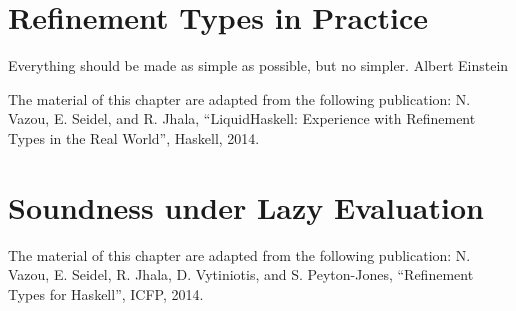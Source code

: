 \chapter{Refinement Types in Practice}\label{chapter:tool}
\makequote
{Everything should be made as simple as possible, but no simpler.}
{Albert Einstein}


\begin{comment}
“One day I will find the right words, and they will be simple.” 
― Jack Kerouac, The Dharma Bums


“Life is really simple, but we insist on making it complicated.” ~ Confucius

“Knowledge is a process of piling up facts; wisdom lies in their simplification.” ~ Martin H. Fischer


“If you can’t explain it to a six year old, you don’t understand it yourself.” ~ Albert Einstein
\end{comment}









The material of this chapter are adapted from the following publication:
\noindent N. Vazou, E. Seidel, and R. Jhala,
``LiquidHaskell: Experience with Refinement Types in the Real World'', 
Haskell, 2014.


\chapter{Soundness under Lazy Evaluation}\label{chapter:refinedhaskell}










The material of this chapter are adapted from the following publication:
\noindent N. Vazou, E. Seidel, R. Jhala, D. Vytiniotis, and S. Peyton-Jones,
``Refinement Types for Haskell'', 
ICFP, 2014.
